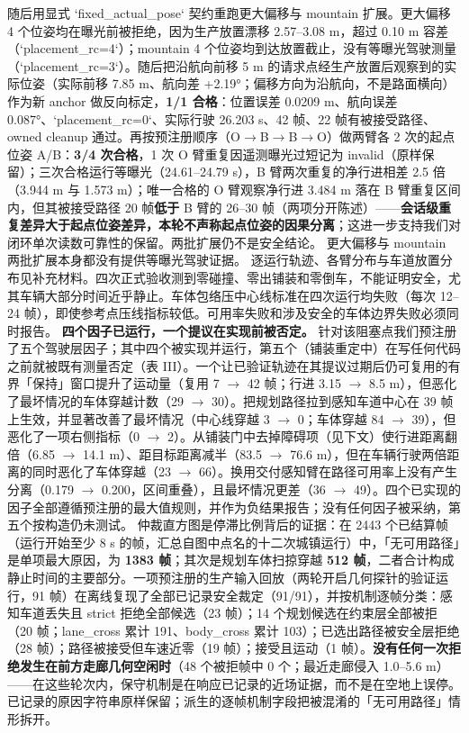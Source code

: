 \documentclass[journal]{IEEEtran}
\begin{document}
随后用显式 `fixed_actual_pose` 契约重跑更大偏移与 mountain 扩展。更大偏移 4 个位姿均在曝光前被拒绝，因为生产放置漂移 2.57--3.08 m，超过 0.10 m 容差（`placement_rc=4`）；mountain 4 个位姿均到达放置截止，没有等曝光驾驶测量（`placement_rc=3`）。随后把沿航向前移 5 m 的请求点经生产放置后观察到的实际位姿（实际前移 7.85 m、航向差 +2.19°；偏移方向为沿航向，不是路面横向）作为新 anchor 做反向标定，\textbf{1/1 合格}：位置误差 0.0209 m、航向误差 0.087°、`placement_rc=0`、实际行驶 26.203 s、42 帧、22 帧有被接受路径、owned cleanup 通过。再按预注册顺序（O$\rightarrow$B$\rightarrow$B$\rightarrow$O）做两臂各 2 次的起点位姿 A/B：\textbf{3/4 次合格}，1 次 O 臂重复因遥测曝光过短记为 invalid（原样保留）；三次合格运行等曝光（24.61--24.79 s），B 臂两次重复的净行进相差 2.5 倍（3.944 m 与 1.573 m）；唯一合格的 O 臂观察净行进 3.484 m 落在 B 臂重复区间内，但其被接受路径 20 帧\textbf{低于} B 臂的 26--30 帧（两项分开陈述）------\textbf{会话级重复差异大于起点位姿差异，本轮不声称起点位姿的因果分离}；这进一步支持我们对闭环单次读数可靠性的保留。两批扩展仍不是安全结论。
更大偏移与 mountain 两批扩展本身都没有提供等曝光驾驶证据。
逐运行轨迹、各臂分布与车道放置分布见补充材料。四次正式验收测到零碰撞、零出铺装和零倒车，不能证明安全，尤其车辆大部分时间近乎静止。车体包络压中心线标准在四次运行均失败（每次 12--24 帧），即使参考点压线指标较低。可用率失败和涉及安全的车体边界失败必须同时报告。
\textbf{四个因子已运行，一个提议在实现前被否定。} 针对该阻塞点我们预注册了五个驾驶层因子；其中四个被实现并运行，第五个（铺装重定中）在写任何代码之前就被既有测量否定（表 III）。一个让已验证轨迹在其提议过期后仍可复用的有界「保持」窗口提升了运动量（复用 7 $\rightarrow$ 42 帧；行进 3.15 $\rightarrow$ 8.5 m），但恶化了最坏情况的车体穿越计数（29 $\rightarrow$ 30）。把规划路径拉到感知车道中心在 39 帧上生效，并显著改善了最坏情况（中心线穿越 3 $\rightarrow$ 0；车体穿越 84 $\rightarrow$ 39），但恶化了一项右侧指标（0 $\rightarrow$ 2）。从铺装门中去掉障碍项（见下文）使行进距离翻倍（6.85 $\rightarrow$ 14.1 m）、距目标距离减半（83.5 $\rightarrow$ 76.6 m），但在车辆行驶两倍距离的同时恶化了车体穿越（23 $\rightarrow$ 66）。换用交付感知臂在路径可用率上没有产生分离（0.179 $\rightarrow$ 0.200，区间重叠），且最坏情况更差（36 $\rightarrow$ 49）。四个已实现的因子全部遵循预注册的最大值规则，并作为负结果报告；没有任何因子被采纳，第五个按构造仍未测试。
仲裁直方图是停滞比例背后的证据：在 2443 个已结算帧（运行开始至少 8 s 的帧，汇总自图中点名的十二次城镇运行）中，「无可用路径」是单项最大原因，为 \textbf{1383 帧}；其次是规划车体扫掠穿越 \textbf{512 帧}，二者合计构成静止时间的主要部分。一项预注册的生产输入回放（两轮开启几何探针的验证运行，91 帧）在离线复现了全部已记录安全裁定（91/91），并按机制逐帧分类：感知车道丢失且 strict 拒绝全部候选（23 帧）；14 个规划候选在约束层全部被拒（20 帧；lane_cross 累计 191、body_cross 累计 103）；已选出路径被安全层拒绝（28 帧）；路径被接受但车速近零（19 帧）；接受且运动（1 帧）。\textbf{没有任何一次拒绝发生在前方走廊几何空闲时}（48 个被拒帧中 0 个；最近走廊侵入 1.0--5.6 m）------在这些轮次内，保守机制是在响应已记录的近场证据，而不是在空地上误停。已记录的原因字符串原样保留；派生的逐帧机制字段把被混淆的「无可用路径」情形拆开。
\end{document}
